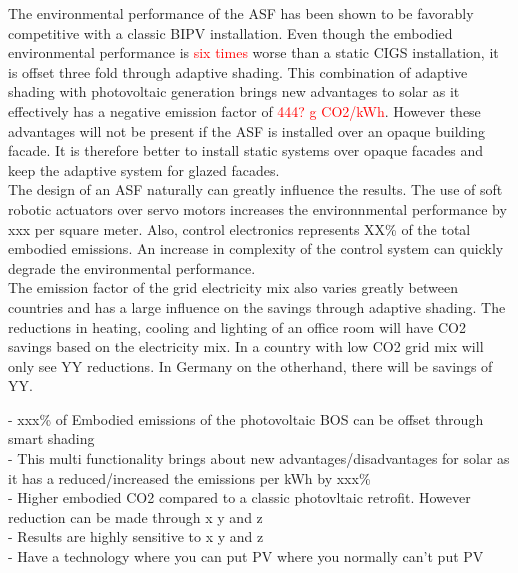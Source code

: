 
The environmental performance of the ASF has been shown to be favorably competitive with a classic BIPV installation. Even though the embodied environmental performance is \textcolor{red}{six times} worse than a static CIGS installation, it is offset three fold through adaptive shading. This combination of adaptive shading with photovoltaic generation brings new advantages to solar as it effectively has a negative emission factor of \textcolor{red}{444? g CO2/kWh}. However these advantages will not be present if the ASF is installed over an opaque building facade. It is therefore better to install static systems over opaque facades and keep the adaptive system for glazed facades. \\

The design of an ASF naturally can greatly influence the results. The use of soft robotic actuators over servo motors increases the environnmental performance by xxx per square meter. Also, control electronics represents XX\% of the total embodied emissions. An increase in complexity of the control system can quickly degrade the environmental performance. \\
The emission factor of the grid electricity mix also varies greatly between countries and has a large influence on the savings through adaptive shading. The reductions in heating, cooling and lighting of an office room will have CO2 savings based on the electricity mix. In a country with low CO2 grid mix will only see YY reductions. In Germany on the otherhand, there will be savings of YY.




- xxx\% of Embodied emissions of the photovoltaic BOS can be offset through smart shading\\
- This multi functionality brings about new advantages/disadvantages for solar as it has a reduced/increased the emissions per kWh by xxx\% \\
- Higher embodied CO2 compared to a classic photovltaic retrofit. However reduction can be made through x y and z\\
- Results are highly sensitive to x y and z\\
- Have a technology where you can put PV where you normally can't put PV